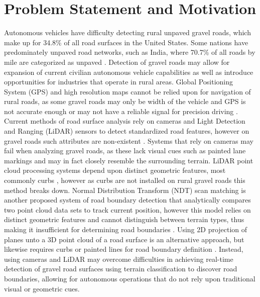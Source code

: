 \documentclass[numbered,pdftex]{ohio-etd}
\begin{document}
\section{Problem Statement and Motivation}
{
	
	{Autonomous vehicles have difficulty detecting rural unpaved gravel roads, which make up for 34.8\% \cite{road_stats_2} of all road surfaces in the United States. Some nations have predominately unpaved road networks, such as India, where 70.7\% of all roads by mile are categorized as unpaved \cite{malik_lal_2019}. Detection of gravel roads may allow for expansion of current civilian autonomous vehicle capabilities as well as introduce opportunities for industries that operate in rural areas. Global Positioning System (GPS) and high resolution maps cannot be relied upon for navigation of rural roads, as some gravel roads may only be width of the vehicle and GPS is not accurate enough or may not have a reliable signal for precision driving \cite{noauthor_gpsgov_nodate}. Current methods of road surface analysis rely on cameras and Light Detection and Ranging (LiDAR) sensors to detect standardized road features, however on gravel roads such attributes are non-existent \cite{skorseth_gravel_nodate}. Systems that rely on cameras may fail when analyzing gravel roads, as these lack visual cues such as painted lane markings \cite{crisman_scarf_1993} and may in fact closely resemble the surrounding terrain. LiDAR point cloud processing systems depend upon distinct geometric features, most commonly curbs \cite{yadav_extraction_2017,liu_new_2013,qiu_fast_2016,fernandes_road_2014,seker_experiments_nodate,yang_semi-automated_2013,miyazaki_line-based_2014,hervieu_road_2013,smadja_road_nodate}, however as curbs are not installed on rural gravel roads \cite{skorseth_gravel_nodate} this method breaks down. Normal Distribution Transform (NDT) scan matching is another proposed system of road boundary detection that analytically compares two point cloud data sets to track current position, however this model relies on distinct geometric features and cannot distinguish between terrain types, thus making it insufficient for determining road boundaries \cite{biber_normal_2003}. Using 2D projection of planes unto a 3D point cloud of a road surface is an alternative approach, but likewise requires curbs or painted lines for road boundary definition \cite{fernandes_road_2014, borkar_robust_2009-1, guo_lane_2015}. Instead, using cameras and LiDAR may overcome difficulties in achieving real-time detection of gravel road surfaces using terrain classification to discover road boundaries, allowing for autonomous operations that do not rely upon traditional visual or geometric cues. }
	
}
\end{document}
